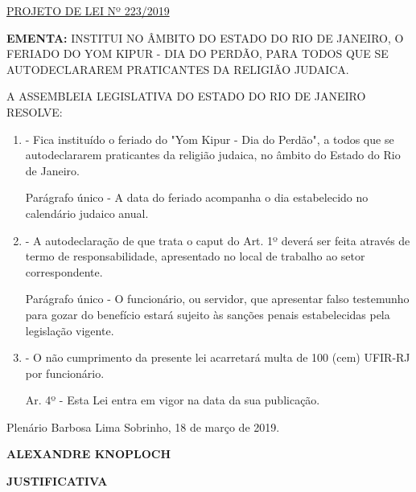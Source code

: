 \documentclass[10pt]{article}
\date{}
\begin{document}
\maketitle
\begin{center}
  \huge
  \vspace{-3cm}\href{http://alerjln1.alerj.rj.gov.br/scpro1923.nsf/f4b46b3cdbba990083256cc900746cf6/e5091e99cf9900e6832583c10061537a?OpenDocument}{PROJETO DE LEI Nº 223/2019}
\bigskip
\bigskip
\bigskip
  
\end{center}

\textbf{EMENTA:} 
INSTITUI NO ÂMBITO DO ESTADO DO RIO DE JANEIRO, O FERIADO DO YOM KIPUR - DIA DO PERDÃO, PARA TODOS QUE SE AUTODECLARAREM PRATICANTES DA RELIGIÃO JUDAICA.








\bigskip

\noindent
A ASSEMBLEIA LEGISLATIVA DO ESTADO DO RIO DE JANEIRO RESOLVE:

\begin{enumerate}[label=Art. \arabic*\textdegree]
\item - Fica instituído o feriado do "Yom Kipur - Dia do Perdão", a todos que se autodeclararem praticantes da religião judaica, no âmbito do Estado do Rio de Janeiro.

Parágrafo único - A data do feriado acompanha o dia estabelecido no calendário judaico anual.

\item - A autodeclaração de que trata o caput do Art. 1º deverá ser feita através de termo de responsabilidade, apresentado no local de trabalho ao setor correspondente.

Parágrafo único - O funcionário, ou servidor, que apresentar falso testemunho para gozar do benefício estará sujeito às sanções penais estabelecidas pela legislação vigente.

\item - O não cumprimento da presente lei acarretará multa de 100 (cem) UFIR-RJ por funcionário.

Ar. 4º - Esta Lei entra em vigor na data da sua publicação.

\end{enumerate}




\begin{center}
  Plenário Barbosa Lima Sobrinho, 18 de março de 2019.

   \bigskip

  \textbf{ ALEXANDRE KNOPLOCH}

  \bigskip

  \textbf{JUSTIFICATIVA}
  \bigskip

\end{center}
\end{document}
